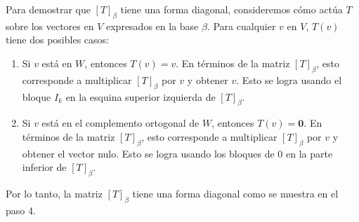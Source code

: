 Para demostrar que $[T]_{\beta}$ tiene una forma diagonal, consideremos cómo actúa $T$ sobre los vectores en $V$ expresados en la base $\beta$. Para cualquier $v$ en $V$, $T(v)$ tiene dos posibles casos:

\begin{enumerate}
    \item Si $v$ está en $W$, entonces $T(v) = v$. En términos de la matriz $[T]_{\beta}$, esto corresponde a multiplicar $[T]_{\beta}$ por $v$ y obtener $v$. Esto se logra usando el bloque $I_k$ en la esquina superior izquierda de $[T]_{\beta}$.

    \item Si $v$ está en el complemento ortogonal de $W$, entonces $T(v) = \mathbf{0}$. En términos de la matriz $[T]_{\beta}$, esto corresponde a multiplicar $[T]_{\beta}$ por $v$ y obtener el vector nulo. Esto se logra usando los bloques de $0$ en la parte inferior de $[T]_{\beta}$.

\end{enumerate}

Por lo tanto, la matriz $[T]_{\beta}$ tiene una forma diagonal como se muestra en el paso 4.